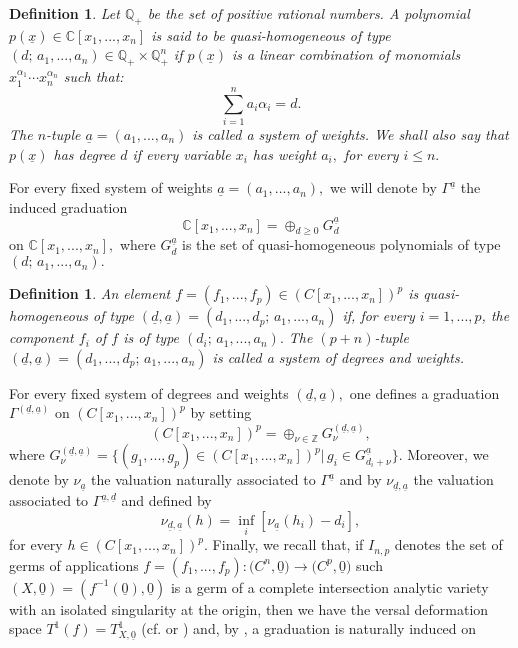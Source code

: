 \documentclass[plain]{amsart}
\newtheorem{definition}[theorem]{\textbf{Definition}}
\begin{document}
\begin{definition}
Let  $\mathbb Q_+$ be the set of positive rational numbers.
A polynomial $p(\underline x)\in\mathbb C[x_1,...,x_n]$ is said to be quasi-homogeneous
of type $(d;\,a_1,...,a_n)\in\mathbb Q_+\times\mathbb Q^n_+$ if $p(\underline x)$ is a linear
combination of monomials $x^{\alpha_1}_1\cdots x^{\alpha_n}_n$ such that:
$$\sum_{i=1}^na_i\alpha_i=d.$$
The $n$-tuple  $\underline a=(a_1,...,a_n)$ is called a system of weights.
We shall also say that $p(\underline x)$ has degree $d$ if every variable $x_i$ has weight $a_i,$
for every $i\leq n.$ 
\end{definition}
For every fixed system of weights $\underline a=(a_1,...,a_n),$ we will denote by $\Gamma^{\underline a}$
the induced graduation
$$\mathbb C[x_1,...,x_n]=\oplus_{d\geq 0}G_d^{\underline a}$$ 
on $\mathbb C[x_1,...,x_n],$ where $G_d^{\underline a}$ is the set of quasi-homogeneous polynomials
of type $(d;\,a_1,...,a_n).$
\begin{definition}
An element $f=(f_1,...,f_p)\in (C[x_1,...,x_n])^p$ is quasi-homogeneous of type 
$(\underline d,\underline a)=(d_1,...,d_p;\,a_1,...,a_n)$ if, for every $i=1,...,p$, the component 
$f_i$ of $f$ is of type $(d_i;\,a_1,...,a_n).$ The $(p+n)$-tuple $(\underline d,\underline a)=(d_1,...,d_p;\,a_1,...,a_n)$
is called a system of degrees and weights.
\end{definition}
For every fixed system of degrees and weights $(\underline d,\underline a),$ one defines a graduation 
$\Gamma^{(\underline d,\underline a)}$ on $ (C[x_1,...,x_n])^p$ by setting 
$$(C[x_1,...,x_n])^p=\oplus_{\nu\in\mathbb Z}G^{(\underline d,\underline a)}_\nu,$$
where $G^{(\underline d,\underline a)}_\nu=\{(g_1,...,g_p)\in (C[x_1,...,x_n])^p|\,g_i\in 
G^{\underline a}_{d_i+\nu}\}.$
Moreover, we denote by $\nu_{\underline a}$ the valuation naturally associated to 
$\Gamma^{\underline a}$ and by $\nu_{\underline d,\underline a}$ the valuation associated
to $\Gamma^{\underline a,\underline d}$ and defined by 
$$
\nu_{\underline d,\underline a}(h)=\inf_i[\nu_{\underline a}(h_i)-d_i],
$$
for every $h\in (C[x_1,...,x_n])^p.$
Finally, we recall that, if $I_{n,p}$ denotes the set of germs of applications 
$f=(f_1,...,f_p):\mathbb (C^n,\underline 0)\to\mathbb (C^p,\underline 0)$ such $(X,\underline 0)=
(f^{-1}(\underline 0),\underline 0)$
is a germ of a complete intersection analytic variety with an isolated singularity at the origin,
then we have the versal deformation space $T^1(f)=T^1_{X,\underline 0}$ (cf. \cite{GLS} or \cite{ser})  
and,  by \cite{Pi}, a graduation is naturally induced on 
\end{document}
